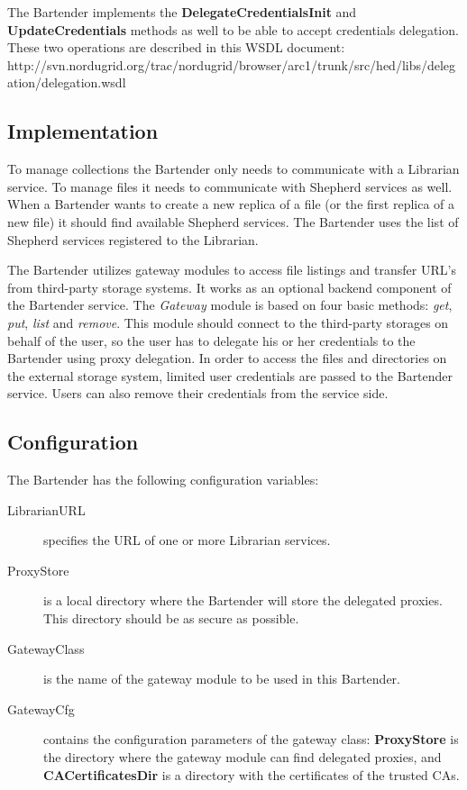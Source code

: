 \documentclass{book}
\begin{document}
The Bartender implements the \textbf{DelegateCredentialsInit} and \textbf{UpdateCredentials} methods as well to be able to accept credentials delegation. These two operations are described in this WSDL document: http://svn.nordugrid.org/trac/nordugrid/browser/arc1/trunk/src/hed/libs/delegation/delegation.wsdl



\subsection{Implementation} %

To manage collections the Bartender only needs to communicate with a Librarian service. To manage files it needs to communicate with Shepherd services as well. When a Bartender wants to create a new replica of a file (or the first replica of a new file) it should find available Shepherd services. The Bartender uses the list of Shepherd services registered to the Librarian.

The Bartender utilizes gateway modules to access file listings and transfer URL's from third-party storage systems. It works as an optional backend component of the Bartender service. The \emph{Gateway} module is based on four basic methods: \emph{get}, \emph{put}, \emph{list} and \emph{remove}. This module should connect to the third-party storages on behalf of the user, so the user has to delegate his or her credentials to the Bartender using proxy delegation. In order to access the files and directories on the external storage system, limited user credentials are passed to the Bartender service. Users can also remove their credentials from the service side. 

\subsection{Configuration} %

The Bartender has the following configuration variables:

\begin{description}
    \item[LibrarianURL] specifies the URL of one or more Librarian services.
    \item[ProxyStore] is a local directory where the Bartender will store the delegated proxies. This directory should be as secure as possible.
    \item[GatewayClass] is the name of the gateway module to be used in this Bartender.
    \item[GatewayCfg] contains the configuration parameters of the gateway class: \textbf{ProxyStore} is the directory where the gateway module can find delegated proxies, and \textbf{CACertificatesDir} is a directory with the certificates of the trusted CAs. 
\end{description}
\end{document}
